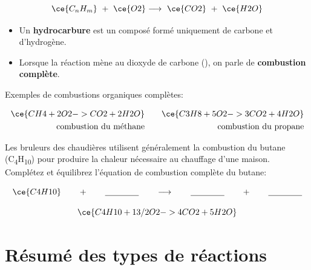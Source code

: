 \documentclass[
  11pt,
  a4paper,
  openany]{book}
\providecommand{\tightlist}{%
  \setlength{\itemsep}{0pt}\setlength{\parskip}{0pt}}
\begin{document}
\[ \ce{C_{n}H_{m}}\ +\ \ce{O2} \longrightarrow\ \ce{CO2}\ +\ \ce{H2O} \]

\begin{itemize}
\tightlist
\item
  Un \textbf{hydrocarbure} est un composé formé uniquement de carbone et d'hydrogène.
\item
  Lorsque la réaction mène au dioxyde de carbone (), on parle de \textbf{combustion complète}.
\end{itemize}

Exemples de combustions organiques complètes:

\[ \begin{split}
  \ce{CH4 + 2O2 -> CO2 + 2H2O} \\
  \text{combustion du méthane}
  \end{split}
  \qquad
  \begin{split}
  \ce{C3H8 + 5O2 -> 3CO2 + 4H2O} \\
    \text{combustion du propane}
  \end{split} \]

\begin{Exercise}
Les bruleurs des chaudières utilisent généralement la combustion du butane (C\textsubscript{4}H\textsubscript{10}) pour produire la chaleur nécessaire au chauffage d'une maison. Complétez et équilibrez l'équation de combustion complète du butane:

\[ \ce{C4H10} \qquad + \qquad \underline{\qquad\qquad} \qquad \longrightarrow \qquad \underline{\qquad\qquad} \qquad + \qquad \underline{\qquad\qquad} \]

\end{Exercise}

\begin{Answer}
\[ \ce{C4H10 + 13/2O2 -> 4CO2 + 5H2O} \]

\end{Answer}

\hypertarget{ruxe9sumuxe9-des-types-de-ruxe9actions}{%
\section{Résumé des types de réactions}\label{ruxe9sumuxe9-des-types-de-ruxe9actions}}
\end{document}
